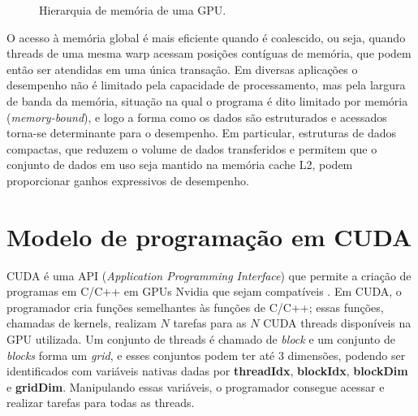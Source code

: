 \begin{figure}[H]
\centering
\caption{Hierarquia de memória de uma GPU.}
\label{fig:memoria}
\end{figure}

O acesso à memória global é mais eficiente quando é coalescido, ou seja, quando threads de uma mesma warp acessam posições contíguas de memória, que podem então ser atendidas em uma única transação. Em diversas aplicações o desempenho não é limitado pela capacidade de processamento, mas pela largura de banda da memória, situação na qual o programa é dito limitado por memória (\textit{memory-bound}), e logo a forma como os dados são estruturados e acessados torna-se determinante para o desempenho. Em particular, estruturas de dados compactas, que reduzem o volume de dados transferidos e permitem que o conjunto de dados em uso seja mantido na memória cache L2, podem proporcionar ganhos expressivos de desempenho.

\section{Modelo de programação em CUDA}

CUDA é uma API (\textit{Application Programming Interface}) que permite a criação de programas em C/C++ em GPUs Nvidia que sejam compatíveis \cite{sanders2011}. Em CUDA, o programador cria funções semelhantes às funções de C/C++; essas funções, chamadas de kernels, realizam $N$ tarefas para as $N$ CUDA threads disponíveis na GPU utilizada. Um conjunto de threads é chamado de \textit{block} e um conjunto de \textit{blocks} forma um \textit{grid}, e esses conjuntos podem ter até 3 dimensões, podendo ser identificados com variáveis nativas dadas por \textbf{threadIdx}, \textbf{blockIdx}, \textbf{blockDim} e \textbf{gridDim}. Manipulando essas variáveis, o programador consegue acessar e realizar tarefas para todas as threads.

